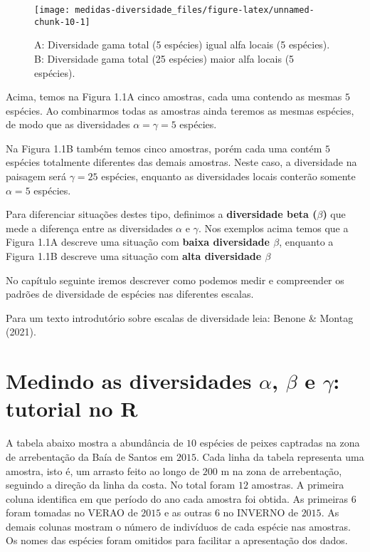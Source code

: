 \documentclass[
]{book}
\begin{document}
\begin{figure}

{\centering \texttt{[image: medidas-diversidade\_files/figure-latex/unnamed-chunk-10-1]} 

}

\caption{A: Diversidade gama total (5 espécies) igual alfa locais (5 espécies). B: Diversidade gama total (25 espécies) maior alfa locais (5 espécies).}\label{fig:unnamed-chunk-10}
\end{figure}

Acima, temos na Figura 1.1A cinco amostras, cada uma contendo as mesmas \(5\) espécies. Ao combinarmos todas as amostras ainda teremos as mesmas espécies, de modo que as diversidades \(\alpha = \gamma = 5\) espécies.

Na Figura 1.1B também temos cinco amostras, porém cada uma contém \(5\) espécies totalmente diferentes das demais amostras. Neste caso, a diversidade na paisagem será \(\gamma = 25\) espécies, enquanto as diversidades locais conterão somente \(\alpha = 5\) espécies.

Para diferenciar situações destes tipo, definimos a \textbf{diversidade beta (\(\beta\))} que mede a diferença entre as diversidades \(\alpha\) e \(\gamma\). Nos exemplos acima temos que a Figura 1.1A descreve uma situação com \textbf{baixa diversidade \(\beta\)}, enquanto a Figura 1.1B descreve uma situação com \textbf{alta diversidade \(\beta\)}

No capítulo seguinte iremos descrever como podemos medir e compreender os padrões de diversidade de espécies nas diferentes escalas.

Para um texto introdutório sobre escalas de diversidade leia: Benone \& Montag (2021).

\hypertarget{diversidader}{%
\chapter{\texorpdfstring{Medindo as diversidades \(\alpha\), \(\beta\) e \(\gamma\): tutorial no R}{Medindo as diversidades \textbackslash alpha, \textbackslash beta e \textbackslash gamma: tutorial no R}}\label{diversidader}}

A tabela abaixo mostra a abundância de \(10\) espécies de peixes captradas na zona de arrebentação da Baía de Santos em \(2015\). Cada linha da tabela representa uma amostra, isto é, um arrasto feito ao longo de \(200\) m na zona de arrebentação, seguindo a direção da linha da costa. No total foram \(12\) amostras. A primeira coluna identifica em que período do ano cada amostra foi obtida. As primeiras 6 foram tomadas no VERAO de \(2015\) e as outras 6 no INVERNO de \(2015\). As demais colunas mostram o número de indivíduos de cada espécie nas amostras. Os nomes das espécies foram omitidos para facilitar a apresentação dos dados.
\end{document}
